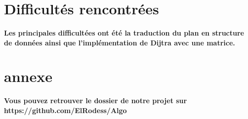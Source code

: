 \documentclass [a4] {article}
\begin{document}
\section{Difficultés rencontrées }
\paragraph{Les principales difficultées ont été la traduction du plan en structure de données ainsi que l'implémentation de Dijtra avec une matrice.}

\section{annexe}
\paragraph{Vous pouvez retrouver le dossier de notre projet sur https://github.com/ElRodess/Algo}                                                                                                                                                                                                                                                                                                                                                                                                                                                                                                                                                                                                                                                             
\end{document}

